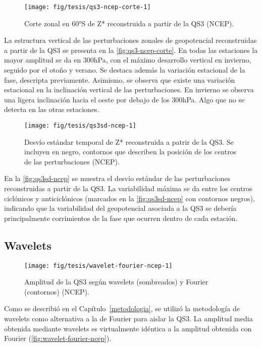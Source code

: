 \documentclass[spanish,a4paper,12pt]{book}
\begin{document}
\begin{figure*}
\texttt{[image: fig/tesis/qs3-ncep-corte-1]} \caption{Corte zonal en 60°S de Z* reconstruida a partir de la QS3 (NCEP).}\label{fig:qs3-ncep-corte}
\end{figure*}

La estructura vertical de las perturbaciones zonales de geopotencial
reconstruidas a partir de la QS3 se presenta en la
\autoref{fig:qs3-ncep-corte}. En todas las estaciones la mayor amplitud
se da en 300hPa, con el máximo desarrollo vertical en invierno, seguido
por el otoño y verano. Se destaca además la variación estacional de la
fase, descripta previamente. Asimismo, se observa que existe una
variación estacional en la inclinación vertical de las perturbaciones.
En invierno se observa una ligera inclinación hacia el oeste por debajo
de los 300hPa. Algo que no se detecta en las otras estaciones.

\begin{figure*}
\texttt{[image: fig/tesis/qs3sd-ncep-1]} \caption{Desvío estándar temporal de Z* reconstruida a patrir de la QS3. Se incluyen en negro, contornos que describen la posición de los centros de las perturbaciones (NCEP).}\label{fig:qs3sd-ncep}
\end{figure*}

En la \autoref{fig:qs3sd-ncep} se muestra el desvío estándar de las
perturbaciones reconstruidas a partir de la QS3. La variabilidad máxima
se da entre los centros ciclónicos y anticiclónicos (marcados en la
\autoref{fig:qs3sd-ncep} con contornos negros), indicando que la
variabilidad del geopotencial asociada a la QS3 se debería
principalmente corrimientos de la fase que ocurren dentro de cada
estación.

\subsection{Wavelets}\label{wavelets}

\begin{figure*}
\texttt{[image: fig/tesis/wavelet-fourier-ncep-1]} \caption{Amplitud de la QS3 según wavelets (sombreados) y Fourier (contornos) (NCEP).}\label{fig:wavelet-fourier-ncep}
\end{figure*}

Como se describió en el Capítulo~\ref{metodologia}, se utilizó la
metodología de wavelets como alternativa a la de Fourier para aislar la
QS3. La amplitud media obtenida mediante wavelets es virtualmente
idéntica a la amplitud obtenida con Fourier
(\autoref{fig:wavelet-fourier-ncep}).
\end{document}

